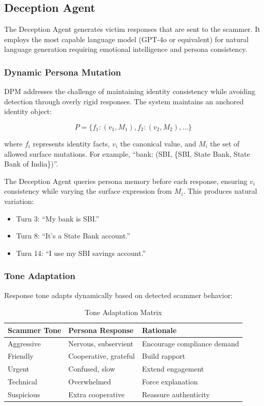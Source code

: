 \documentclass[conference]{IEEEtran}
\begin{document}
\subsection{Deception Agent}

The Deception Agent generates victim responses that are sent to the scammer. It employs the most capable language model (GPT-4o or equivalent) for natural language generation requiring emotional intelligence and persona consistency.

\subsubsection{Dynamic Persona Mutation}

DPM addresses the challenge of maintaining identity consistency while avoiding detection through overly rigid responses. The system maintains an anchored identity object:

\begin{equation}
P = \{f_1: (v_1, M_1), f_2: (v_2, M_2), ...\}
\end{equation}

where $f_i$ represents identity facts, $v_i$ the canonical value, and $M_i$ the set of allowed surface mutations. For example, ``bank: (SBI, \{SBI, State Bank, State Bank of India\})''.

The Deception Agent queries persona memory before each response, ensuring $v_i$ consistency while varying the surface expression from $M_i$. This produces natural variation:
\begin{itemize}
    \item Turn 3: ``My bank is SBI.''
    \item Turn 8: ``It's a State Bank account.''
    \item Turn 14: ``I use my SBI savings account.''
\end{itemize}

\subsubsection{Tone Adaptation}

Response tone adapts dynamically based on detected scammer behavior:

\begin{table}[htbp]
\caption{Tone Adaptation Matrix}
\label{tab:tone}
\begin{center}
\begin{tabular}{|l|l|l|}
\hline
\textbf{Scammer Tone} & \textbf{Persona Response} & \textbf{Rationale} \\
\hline
Aggressive & Nervous, subservient & Encourage compliance demand \\
\hline
Friendly & Cooperative, grateful & Build rapport \\
\hline
Urgent & Confused, slow & Extend engagement \\
\hline
Technical & Overwhelmed & Force explanation \\
\hline
Suspicious & Extra cooperative & Reassure authenticity \\
\hline
\end{tabular}
\end{center}
\end{table}
\end{document}
